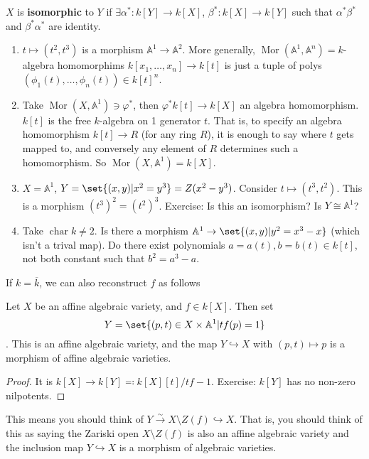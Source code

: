 \documentclass{article}
\newcommand{\A}{\mathbb{A}}
\DeclareMathOperator{\chara}{char}
\DeclareMathOperator{\Mor}{Mor}
\begin{document}
\begin{defi}[Isomorphic]
    $X$ is \textbf{isomorphic} to $Y$ if $\exists \alpha^*: k[Y] \to k[X]$, $\beta^*: k[X] \to k[Y]$ such that $\alpha^* \beta^*$ and $\beta^* \alpha^*$ are identity.
\end{defi}
\begin{eg}
    \begin{enumerate}[label=(\roman*)]
        \item $t \mapsto (t^2, t^3)$ is a morphism $\A^1 \to \A^2$.
            More generally, $\Mor(\A^1, \A^n) = k$-algebra homomorphims $k[x_1, \dotsc, x_n] \to k[t]$ is just a tuple of polys $(\phi_1(t), \dotsc, \phi_n(t)) \in k[t]^n$.
        \item Take $\Mor(X, \A^1) \ni \varphi^*$, then $\varphi^* k[t] \to k[X]$ an algebra homomorphism. $k[t]$ is the free $k$-algebra on 1 generator $t$.
            That is, to specify an algebra homomorphism $k[t] \to R$ (for any ring $R$), it is enough to say where $t$ gets mapped to, and conversely any element of $R$ determines such a homomorphism.
            So $\Mor(X, \A^1) = k[X]$.
        \item $X = \A^1$, $Y = \set{(x, y) | x^2 = y^3} = Z(x^2 - y^3)$. Consider $t \mapsto (t^3, t^2)$. This is a morphism $(t^3)^2 = (t^2)^3$.
            Exercise: Is this an isomorphism? Is $Y \cong \A^1$?
        \item Take $\chara k \neq 2$. Is there a morphism $\A^1 \to \set{(x, y) | y^2 = x^3 - x}$ (which isn't a trival map).
            Do there exist polynomials $a = a(t), b=b(t) \in k[t]$, not both constant such that $b^2 = a^3 - a$.
    \end{enumerate}
\end{eg}

If $k = \overline{k}$, we can also reconstruct $f$ as follows

\begin{prop}
    Let $X$ be an affine algebraic variety, and $f \in k[X]$.  Then set \begin{equation*}Y = \set{(p, t) \in X \times \A^1 | t f(p) = 1}\end{equation*}.
    This is an affine algebraic variety, and the map $Y \hookrightarrow X$ with $(p, t) \mapsto p$ is a morphism of affine algebraic varieties.
\end{prop}
\begin{proof}
    It is $k[X] \to k[Y] \eqqcolon k[X][t]/tf-1$. Exercise: $k[Y]$ has no non-zero nilpotents.
\end{proof}
This means you should think of $Y \xrightarrow{\sim} X \setminus Z(f) \hookrightarrow X$.
That is, you should think of this as saying the Zariski open $X \setminus Z(f)$ is also an affine algebraic variety and the inclusion map $Y \hookrightarrow X$ is a morphism of algebraic varieties.
\end{document}
